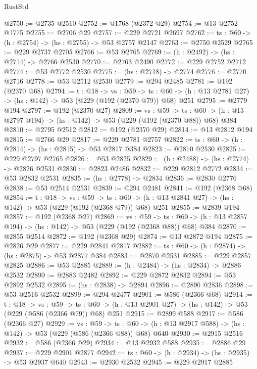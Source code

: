 \begin{lexlean}{RustStd}
\begin{coremodule}
@2750 := @2735 @2510
@2752 := @1768 (@2372 @29)
@2754 := @13 @2752 @1775
@2755 := @2706 @29
@2757 := @229 @2721 @2697
@2762 := {ts : @60} -> (h : @2754) -> (hs : @2755) -> @53 @2757 @2147
@2763 := @2750 @2529
@2765 := @229 @2737 @2705
@2766 := @53 @2765
@2769 := (h : @2492) -> (hs : @2714) -> @2766 @2530
@2770 := @2763 @2490
@2772 := @229 @2752 @2712
@2774 := @53 @2772 @2530
@2775 := (hs : @2718) -> @2774
@2776 := @2770 @2716
@2778 := @53 @2512 @2530
@2779 := @294 @2485
@2781 := @192 (@2370 @68)
@2794 := {t : @18} ->
  {vs : @59} ->
  {ts : @60} -> (h : @13 @2781 @27) -> (hs : @142) -> @53 (@229 (@192 (@2370 @79)) @68) @251
@2795 := @2779 @194
@2797 := @192 (@2370 @27)
@2809 := {vs : @59} ->
  {ts : @60} -> (h : @13 @2797 @194) -> (hs : @142) -> @53 (@229 (@192 (@2370 @88)) @68) @384
@2810 := @2795 @2512
@2812 := @192 (@2370 @29)
@2814 := @13 @2812 @194
@2815 := @2766 @29
@2817 := @229 @2781 @2757
@2822 := {ts : @60} -> (h : @2814) -> (hs : @2815) -> @53 @2817 @384
@2823 := @2810 @2530
@2825 := @229 @2797 @2765
@2826 := @53 @2825
@2829 := (h : @2488) -> (hs : @2774) -> @2826 @2531
@2830 := @2823 @2486
@2832 := @229 @2812 @2772
@2834 := @53 @2832 @2531
@2835 := (hs : @2778) -> @2834
@2836 := @2830 @2776
@2838 := @53 @2514 @2531
@2839 := @294 @2481
@2841 := @192 (@2368 @68)
@2854 := {t : @18} ->
  {vs : @59} ->
  {ts : @60} -> (h : @13 @2841 @27) -> (hs : @142) -> @53 (@229 (@192 (@2368 @79)) @68) @251
@2855 := @2839 @194
@2857 := @192 (@2368 @27)
@2869 := {vs : @59} ->
  {ts : @60} -> (h : @13 @2857 @194) -> (hs : @142) -> @53 (@229 (@192 (@2368 @88)) @68) @384
@2870 := @2855 @2514
@2872 := @192 (@2368 @29)
@2874 := @13 @2872 @194
@2875 := @2826 @29
@2877 := @229 @2841 @2817
@2882 := {ts : @60} -> (h : @2874) -> (hs : @2875) -> @53 @2877 @384
@2883 := @2870 @2531
@2885 := @229 @2857 @2825
@2886 := @53 @2885
@2889 := (h : @2484) -> (hs : @2834) -> @2886 @2532
@2890 := @2883 @2482
@2892 := @229 @2872 @2832
@2894 := @53 @2892 @2532
@2895 := (hs : @2838) -> @2894
@2896 := @2890 @2836
@2898 := @53 @2516 @2532
@2899 := @294 @2477
@2901 := @586 (@2366 @68)
@2914 := {t : @18} ->
  {vs : @59} ->
  {ts : @60} -> (h : @13 @2901 @27) -> (hs : @142) -> @53 (@229 (@586 (@2366 @79)) @68) @251
@2915 := @2899 @588
@2917 := @586 (@2366 @27)
@2929 := {vs : @59} ->
  {ts : @60} -> (h : @13 @2917 @588) -> (hs : @142) -> @53 (@229 (@586 (@2366 @88)) @68) @640
@2930 := @2915 @2516
@2932 := @586 (@2366 @29)
@2934 := @13 @2932 @588
@2935 := @2886 @29
@2937 := @229 @2901 @2877
@2942 := {ts : @60} -> (h : @2934) -> (hs : @2935) -> @53 @2937 @640
@2943 := @2930 @2532
@2945 := @229 @2917 @2885

\end{coremodule}
\end{lexlean}
